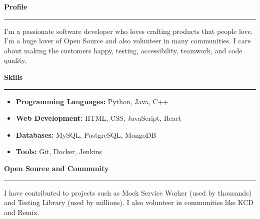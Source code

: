 \documentclass[a4paper,11pt]{article}
\newcommand{\sectiontitle}[1]{\textbf{\Large #1}\par\vspace{-1em}\noindent\rule{\linewidth}{0.3mm}\par\vspace{0.3em}}
\begin{document}
\begin{multicols}{2}
	\vfill\null
	\columnbreak

	\sectiontitle{Profile}
	I'm a passionate software developer who loves crafting products that people love. I'm a huge lover of Open Source and also volunteer in many communities. I care about making the customers happy, testing, accessibility, teamwork, and code quality.

	\vspace{1em}

	\sectiontitle{Skills}
	\begin{itemize}
		\item \textbf{Programming Languages:} Python, Java, C++
		\item \textbf{Web Development:} HTML, CSS, JavaScript, React
		\item \textbf{Databases:} MySQL, PostgreSQL, MongoDB
		\item \textbf{Tools:} Git, Docker, Jenkins
	\end{itemize}

	\vspace{1em}

	\sectiontitle{Open Source and Community}
	I have contributed to projects such as Mock Service Worker (used by thousands) and Testing Library (used by millions). I also volunteer in communities like KCD and Remix.

\end{multicols}
\end{document}
